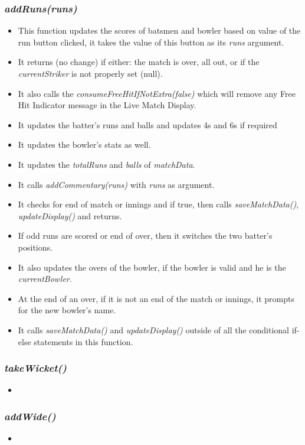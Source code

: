 \documentclass[a4paper,12pt]{article}
\begin{document}
\subsubsection{\textit{addRuns(runs)}}
\begin{itemize}
\item This function updates the scores of batsmen and bowler based on value of the run button clicked, it takes the value of this button as its \textit{runs} argument.
\item It returns (no change) if either: the match is over, all out, or if the \textit{currentStriker} is not properly set (null).
\item It also calls the \textit{consumeFreeHitIfNotExtra(false)} which will remove any Free Hit Indicator message in the Live Match Display.
\item It updates the batter's runs and balls and updates 4s and 6s if required
\item It updates the bowler's stats as well.
\item It updates the \textit{totalRuns} and \textit{balls} of \textit{matchData}.
\item It calls \textit{addCommentary(runs)} with \textit{runs} as argument.
\item It checks for end of match or innings and if true, then calls \textit{saveMatchData()}, \textit{updateDisplay()} and returns.
\item If odd runs are scored or end of over, then it switches the two batter's positions.
\item It also updates the overs of the bowler, if the bowler is valid and he is the \textit{currentBowler}.
\item At the end of an over, if it is not an end of the match or innings, it prompts for the new bowler's name.
\item It calls \textit{saveMatchData()} and \textit{updateDisplay()} outside of all the conditional if-else statements in this function. 
\end{itemize}

\subsubsection{\textit{takeWicket()}}
\begin{itemize}
\item 
\end{itemize}

\subsubsection{\textit{addWide()}}
\begin{itemize}
\item 
\end{itemize}
\end{document}
